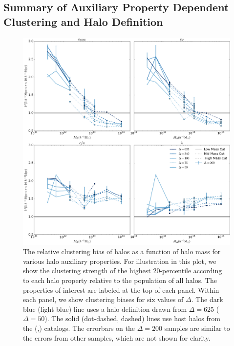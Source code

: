 \documentclass[usenatbib,fleqn]{mnras}
\begin{document}
\subsection{Summary of Auxiliary Property Dependent Clustering and Halo Definition}


\begin{figure}
	\centering
	\includegraphics[width=\textwidth]{biasplot.pdf}
	\caption{
The relative clustering bias of halos as a function of halo mass for various halo auxiliary properties. For illustration in this plot, we show the clustering strength of the highest 20-percentile according to each halo property relative to the population of all halos. The properties of interest are labeled at the top of each panel. Within each panel, we show clustering biases for six values of $\Delta$. The dark blue (light blue) line uses a halo definition drawn from $\Delta = 625$ ($\Delta = 50$). The solid (dot-dashed, dashed) lines use host halos from the \simA (\simB,\simC) catalogs. The errorbars on the $\Delta=200$ samples are similar to the errors from other samples, which are not shown for clarity. 
}
\label{fig:biascompare}
\end{figure}
\end{document}
